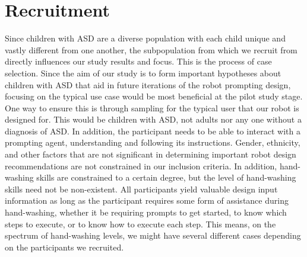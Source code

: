 \section{Recruitment}
\label{sec:Recruitment}
Since children with ASD are a diverse population with each child unique and vastly different from one another, the subpopulation from which we recruit from directly influences our study results and focus.  This is the process of case selection.  Since the aim of our study is to form important hypotheses about children with ASD that aid in future iterations of the robot prompting design, focusing on the typical use case would be most beneficial at the pilot study stage.  One way to ensure this is through sampling for the typical user that our robot is designed for.  This would be children with ASD, not adults nor any one without a diagnosis of ASD.  In addition, the participant needs to be able to interact with a prompting agent, understanding and following its instructions.  Gender, ethnicity, and other factors that are not significant in determining important robot design recommendations are not constrained in our inclusion criteria.  In addition, hand-washing skills are constrained to a certain degree, but the level of hand-washing skills need not be non-existent.  All participants yield valuable design input information as long as the participant requires some form of assistance during hand-washing, whether it be requiring prompts to get started, to know which steps to execute, or to know how to execute each step.  This means, on the spectrum of hand-washing levels, we might have several different cases depending on the participants we recruited.

